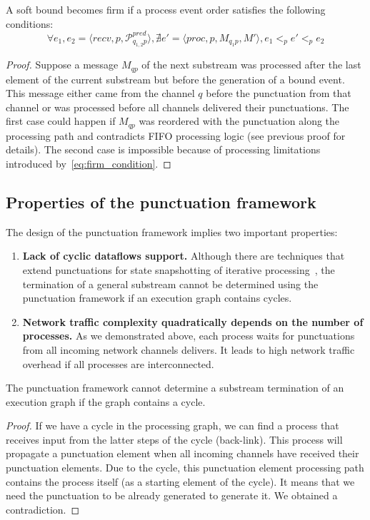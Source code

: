 \begin{lemma}
A soft bound becomes firm if a process event order satisfies the following conditions:
\begin{equation}
\label{eq:firm_condition}
\forall e_1, e_2 = \langle recv, p, \mathcal{P}^{pred}_{q_{1,2}p} \rangle, \nexists e' = \langle proc, p, M_{q_1p}, M' \rangle, e_1 <_p e' <_p e_2
\end{equation}
\end{lemma}
\begin{proof}
Suppose a message $M_{qp}$ of the next substream was processed after the last element of the current substream but before the generation of a bound event. This message either came from the channel $q$ before the punctuation from that channel or was processed before all channels delivered their punctuations. The first case could happen if $M_{qp}$ was reordered with the punctuation along the processing path and contradicts FIFO processing logic (see previous proof for details). The second case is impossible because of processing limitations introduced by~\ref{eq:firm_condition}.
\end{proof}

\subsection{Properties of the punctuation framework}

The design of the punctuation framework implies two important properties:

\begin{enumerate}
    \item {\bf Lack of cyclic dataflows support.} Although there are techniques that extend punctuations for state snapshotting of iterative processing~\cite{Carbone:2017:SMA:3137765.3137777}, the termination of a general substream cannot be determined using the punctuation framework if an execution graph contains cycles.
    \item {\bf Network traffic complexity quadratically depends on the number of processes.} As we demonstrated above, each process waits for punctuations from all incoming network channels delivers. It leads to high network traffic overhead if all processes are interconnected.
\end{enumerate}

\begin{lemma}
The punctuation framework cannot determine a substream termination of an execution graph if the graph contains a cycle.
\end{lemma}
\begin{proof}
If we have a cycle in the processing graph, we can find a process that receives input from the latter steps of the cycle (back-link). This process will propagate a punctuation element when all incoming channels have received their punctuation elements. Due to the cycle, this punctuation element processing path contains the process itself (as a starting element of the cycle). It means that we need the punctuation to be already generated to generate it. We obtained a contradiction.
\end{proof}

